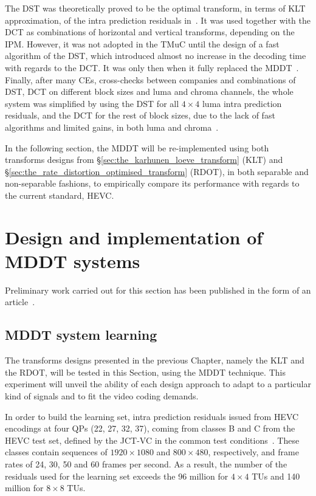 \documentclass[11pt,a4paper,openright,twoside]{book}
\numberwithin{equation}{section} %
\numberwithin{figure}{section} %
\numberwithin{table}{section} %
\begin{document}
The \ac{DST} was theoretically proved to be the optimal transform, in
terms of \ac{KLT} approximation, of the intra prediction residuals
in~\cite{JCTVC-C108, JCTVC-D033}.
It was used together with the \ac{DCT} as combinations of horizontal and
vertical transforms, depending on the \ac{IPM}.
However, it was not adopted in the \ac{TMuC} until the design of a fast
algorithm of the \ac{DST}, which introduced almost no increase in the
decoding time with regards to the \ac{DCT}.
It was only then when it fully replaced the \ac{MDDT}~\cite{JCTVC-D048,
JCTVC-E125, JCTVC-F283, JCTVC-G108}.
Finally, after many \acp{CE}, cross-checks between companies and
combinations of \ac{DST}, \ac{DCT} on different block sizes and luma and
chroma channels, the whole system was simplified by using the \ac{DST}
for all $4\times4$ luma intra prediction residuals, and the \ac{DCT} for
the rest of block sizes, due to the lack of fast algorithms and limited
gains, in both luma and chroma~\cite{JCTVC-J0021}.

In the following section, the \ac{MDDT} will be re-implemented using both
transforms designs from \S\ref{sec:the_karhunen_loeve_transform} (\ac{KLT})
and \S\ref{sec:the_rate_distortion_optimised_transform} (\ac{RDOT}), in both
separable and non-separable fashions, to empirically compare its performance
with regards to the current standard, \ac{HEVC}.

\section{Design and implementation of \acs{MDDT} systems}
\label{sec:design_and_implementation_of_mddt_systems}

Preliminary work carried out for this section has been published in the form
of an article~\cite{arrufat-14-mddt-rdot}.

\subsection{\acs{MDDT} system learning}
\label{sub:mddt_system_learning}

The transforms designs presented in the previous Chapter, namely the \ac{KLT}
and the \ac{RDOT}, will be tested in this Section, using the \ac{MDDT}
technique.
This experiment will unveil the ability of each design approach to adapt to a
particular kind of signals and to fit the video coding demands.

In order to build the learning set, intra prediction residuals issued from
\ac{HEVC} encodings at four \acp{QP} (22, 27, 32, 37), coming from classes B
and C from the \ac{HEVC} test set, defined by the \ac{JCT-VC} in the common
test conditions~\cite{bossen-12-common-test-conditions}.
These classes contain sequences of $1920\times1080$ and $800\times480$,
respectively, and frame rates of 24, 30, 50 and 60 frames per second.
As a result, the number of the residuals used for the learning set exceeds the
96 million for $4\times4$ \acp{TU} and 140 million for $8\times8$ \acp{TU}.
\end{document}
